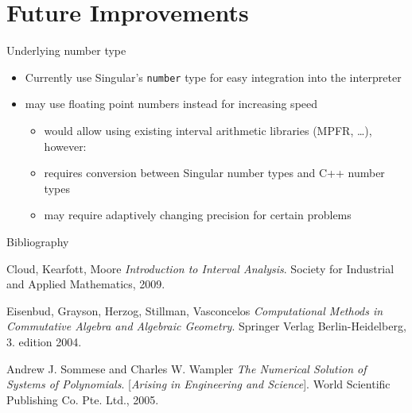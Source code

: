 \documentclass[german,10pt,xcolor=colortbl,compress,handout]{beamer}
\begin{document}
\section{Future Improvements}

\begin{frame}{Underlying number type}
    \begin{itemize}
        \item Currently use Singular's \texttt{number} type for easy integration into the
            interpreter
        \item may use floating point numbers instead for increasing speed
            \begin{itemize}
                \item would allow using existing interval arithmetic libraries (MPFR,
                    \dots), however:
                \item requires conversion between Singular number types and C++ number
                    types
                \item may require adaptively changing precision for certain problems
            \end{itemize}
    \end{itemize}
\end{frame}


\begin{frame}{Bibliography}
    
    \begin{thebibliography}{9}
         Cloud, Kearfott, Moore
            \textit{Introduction to Interval Analysis}.
            Society for Industrial and Applied Mathematics, 2009.


         Eisenbud, Grayson, Herzog, Stillman, Vasconcelos
            \textit{Computational Methods in Commutative Algebra and Algebraic Geometry}.
            Springer Verlag Berlin-Heidelberg, 3. edition 2004.

         Andrew J. Sommese and Charles W. Wampler
            \textit{The Numerical Solution of Systems of Polynomials}. [\textit{Arising in
            Engineering and Science}].
            World Scientific Publishing Co. Pte. Ltd., 2005.

    \end{thebibliography}
\end{frame}
\end{document}

